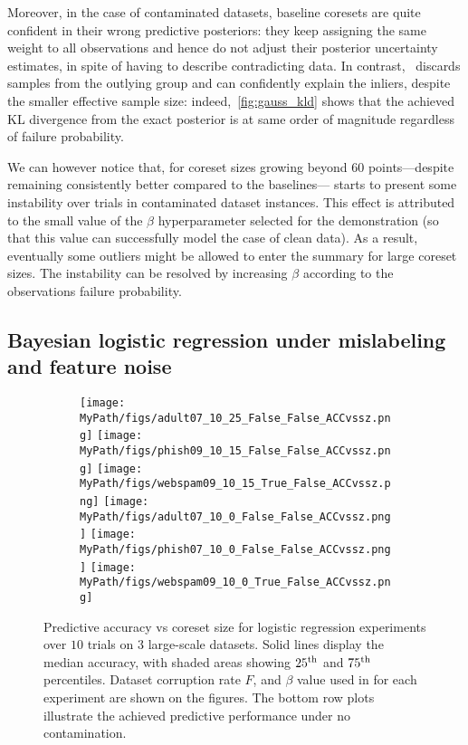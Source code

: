 Moreover, in the case of contaminated datasets, baseline coresets are quite confident in their wrong predictive posteriors: they keep assigning the same weight to all observations and hence do not adjust their posterior uncertainty estimates, in spite of having to describe contradicting data. In contrast,~\bcores{} discards samples from the outlying group and can confidently explain the inliers, despite the smaller effective sample size: indeed,~\cref{fig:gauss_kld} shows that the achieved KL divergence from the exact posterior is at same order of magnitude regardless of failure probability. 

We can however notice that, for coreset sizes growing beyond 60 points---despite remaining consistently better compared to the baselines---\bcores{} starts to present some instability over trials in contaminated dataset instances. This effect is attributed to the small value of the $\beta$ hyperparameter  selected for the demonstration (so that this value can successfully model the case of clean data). As a result, eventually some outliers might be allowed to enter the summary for large coreset sizes. The instability can be resolved by increasing $\beta$ according to the observations failure probability. 


\subsection{Bayesian logistic regression under mislabeling and feature noise}
\label{subsec:logreg-expt}

\begin{figure}[!ht]
	\begin{subfigure}[b]{0.9\textwidth} 
		\centering
		\texttt{[image: \\MyPath/figs/adult07\_10\_25\_False\_False\_ACCvssz.png]}
		\centering
		\hfill
		\texttt{[image: \\MyPath/figs/phish09\_10\_15\_False\_False\_ACCvssz.png]}
		\centering
		\hfill
		\texttt{[image: \\MyPath/figs/webspam09\_10\_15\_True\_False\_ACCvssz.png]}
		\centering
		\texttt{[image: \\MyPath/figs/adult07\_10\_0\_False\_False\_ACCvssz.png]}
		\centering
		\hfill
		\texttt{[image: \\MyPath/figs/phish07\_10\_0\_False\_False\_ACCvssz.png]}
		\centering
		\hfill
		\texttt{[image: \\MyPath/figs/webspam09\_10\_0\_True\_False\_ACCvssz.png]}
	\end{subfigure}	
	\centering
	\caption{Predictive accuracy vs coreset size for logistic regression experiments over $10$ trials on $3$ large-scale datasets. Solid lines display the median accuracy, with shaded areas showing $25\textsuperscript{th}$ and $75\textsuperscript{th}$ percentiles. Dataset corruption rate $F$, and $\beta$ value used in \bcores{} for each experiment are shown on the figures. The bottom row plots illustrate the achieved predictive performance under no contamination.}
	\label{fig:logreg_plot}
\end{figure}

